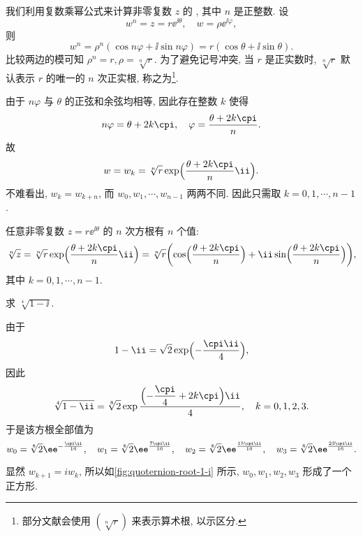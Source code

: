 我们利用复数乘幂公式来计算非零复数 $z$ 的 , 其中 $n$ 是正整数.
设
\[
  w^n=z=r\ee^{\ii\theta},\quad 
  w=\rho \ee^{\ii\varphi},
\]
则
\[
  w^n=\rho^n(\cos{n\varphi}+\ii\sin{n\varphi})
     =r(\cos\theta+\ii\sin\theta).
\]
比较两边的模可知 $\rho^n=r,\rho=\sqrt[n]r$.
为了避免记号冲突, 当 $r$ 是正实数时, $\sqrt[n]r$ 默认表示 $r$ 的唯一的 $n$ 次正实根, 称之为\footnote{%
  部分文献会使用 $(\sqrt[n]r)$ 来表示算术根, 以示区分.%
}.

由于 $n\varphi$ 与 $\theta$ 的正弦和余弦均相等, 因此存在整数 $k$ 使得
\[
  n\varphi=\theta+2k\cpi,\quad \varphi=\frac{\theta+2k\cpi}n.
\]
故
\[
  w=w_k=\sqrt[n]r\exp\Bigl(\frac{\theta+2k\cpi}n\ii\Bigr).
\]
不难看出, $w_k=w_{k+n}$, 而 $w_0,w_1,\cdots,w_{n-1}$ 两两不同.
因此只需取 $k=0,1,\cdots,n-1$.
\begin{theorem}
  \label{thm:root}
  任意非零复数 $z=r\ee^{\ii\theta}$ 的 $n$ 次方根有 $n$ 个值:
  \[
     \sqrt[n]z
    =\sqrt[n]r\exp\Bigl(\frac{\theta+2k\cpi}n\ii\Bigr)
    =\sqrt[n]r\biggl(
      \cos\Bigl(\frac{\theta+2k\cpi}n\Bigr)
      +\ii\sin\Bigl(\frac{\theta+2k\cpi}n\Bigr)
    \biggr),
  \]
  其中 $k=0,1,\cdots,n-1$.
\end{theorem}

\begin{example}
  求 $\sqrt[4]{1-\ii}$.
\end{example}

\begin{solution}
  由于
  \[
    1-\ii=\sqrt2\exp\Bigl(-\frac{\cpi \ii}4\Bigr),
  \]
  因此
  \[
     \sqrt[4]{1-\ii}
    =\sqrt[8]2\exp\frac{\Bigl(-\dfrac\cpi4+2k\cpi\Bigr)\ii}4,\quad k=0,1,2,3.
  \]
  于是该方根全部值为
  \[
    w_0=\sqrt[8]2\ee^{-\frac{\cpi \ii}{16}},\quad
    w_1=\sqrt[8]2\ee^{\frac{7\cpi \ii}{16}},\quad
    w_2=\sqrt[8]2\ee^{\frac{15\cpi \ii}{16}},\quad
    w_3=\sqrt[8]2\ee^{\frac{23\cpi \ii}{16}}.
  \]
\end{solution}

显然 $w_{k+1}=iw_k$, 所以如\ref{fig:quoternion-root-1-i} 所示, $w_0,w_1,w_2,w_3$ 形成了一个正方形.

